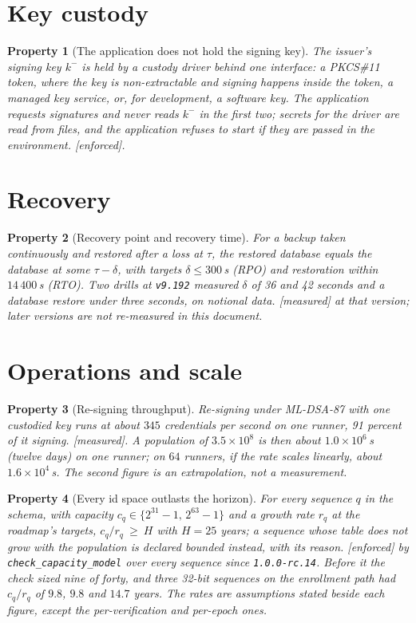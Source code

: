 \documentclass[11pt]{article}
\newtheorem{property}{Property}
\theoremstyle{remark}
\newcommand{\code}[1]{\texttt{#1}}
\newcommand{\emark}[1]{\textup{\textsf{[#1]}}}
\begin{document}
\section{Key custody}

\begin{property}[The application does not hold the signing key] The issuer's signing key $k^-$ is held
by a custody driver behind one interface: a PKCS\#11 token, where the key is non-extractable and
signing happens inside the token, a managed key service, or, for development, a software key. The
application requests signatures and never reads $k^-$ in the first two; secrets for the driver are read
from files, and the application refuses to start if they are passed in the environment.
\emark{enforced}.
\end{property}

\section{Recovery}

\begin{property}[Recovery point and recovery time] For a backup taken continuously and restored after
a loss at $\tau$, the restored database equals the database at some $\tau-\delta$, with targets
$\delta\le300$\,s (RPO) and restoration within $14\,400$\,s (RTO). Two drills at \code{v9.192}
measured $\delta$ of 36 and 42 seconds and a database restore under three seconds, on notional data.
\emark{measured} at that version; later versions are not re-measured in this document.
\end{property}

\section{Operations and scale}

\begin{property}[Re-signing throughput] Re-signing under ML-DSA-87 with one custodied key runs at
about $345$ credentials per second on one runner, 91 percent of it signing. \emark{measured}. A
population of $3.5\times10^8$ is then about $1.0\times10^6$\,s (twelve days) on one runner; on
$64$ runners, \emph{if the rate scales linearly}, about $1.6\times10^4$\,s. The second figure is an
extrapolation, not a measurement.
\end{property}

\begin{property}[Every id space outlasts the horizon] For every sequence $q$ in the schema, with
capacity $c_q\in\{2^{31}-1,\,2^{63}-1\}$ and a growth rate $r_q$ at the roadmap's targets,
$c_q/r_q\ \ge\ H$ with $H=25$ years; a sequence whose table does not grow with the population is
declared bounded instead, with its reason. \emark{enforced} by \code{check\_capacity\_model} over
every sequence since \code{1.0.0-rc.14}. Before it the check sized nine of forty, and three 32-bit
sequences on the enrollment path had $c_q/r_q$ of $9.8$, $9.8$ and $14.7$ years. The rates are
assumptions stated beside each figure, except the per-verification and per-epoch ones.
\end{property}
\end{document}
